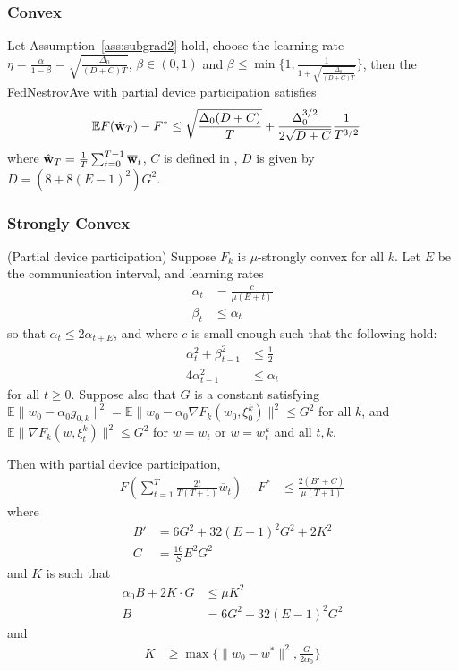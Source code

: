 \subsubsection{Convex}
\begin{theorem}
	Let Assumption~\ref{ass:subgrad2} hold, choose the learning rate $\eta = \frac{\alpha}{1 - \beta} = \sqrt{\frac{\Delta_0}{(D+C)T}}$, $\beta \in (0, 1)$ and $\beta \leq \min\{1, \frac{1}{1 + \sqrt{\frac{\Delta_0}{(D+C)T}}}\}$, then the FedNestrovAve with partial device participation satisfies
	\begin{align}
		 \mathbb{E} F(\hat{{\mathbf{w}}}_T) - F^* &\leq \sqrt{\frac{\Delta_0(D + C)}{T}} + \frac{\Delta_0^{3/2}}{2\sqrt{D+C}}\frac{1}{T^{3/2}} 
	\end{align}
	where $\hat{{\mathbf{w}}}_T = \frac{1}{T}\sum_{t=0}^{T-1} {\overline{\mathbf{w}}}_t$, $C$ is defined in \eq{\ref{eq:partialsample}},
$D$ is given by $D = (8 + 8(E-1)^2)G^2$.
	\label{th:nasgcvxnonsmoth}
\end{theorem}

\subsubsection{Strongly Convex}
% 
\begin{theorem}
	(Partial device participation) Suppose $F_{k}$ is $\mu$-strongly
	convex for all $k$. Let $E$ be the communication interval, and learning
	rates 
	\begin{align*}
	\alpha_{t} & =\frac{c}{\mu(E+t)}\\
	\beta_{t} & \leq\alpha_{t}
	\end{align*}
	so that $\alpha_{t}\leq2\alpha_{t+E}$, and where $c$ is small enough
	such that the following hold: 
	\begin{align*}
	\alpha_{t}^{2}+\beta_{t-1}^{2} & \leq\frac{1}{2}\\
	4\alpha_{t-1}^{2} & \leq\alpha_{t}
	\end{align*}
	for all $t\geq0$. Suppose also that $G$ is a constant satisfying
	$\mathbb{E}\|w_{0}-\alpha_{0}g_{0,k}\|^{2}=\mathbb{E}\|w_{0}-\alpha_{0}\nabla F_{k}(w_{0},\xi_{0}^{k})\|^{2}\leq G^{2}$
	for all $k$, and $\mathbb{E}\|\nabla F_{k}(w,\xi_{t}^{k})\|^{2}\leq G^{2}$
	for $w=\overline{w}_{t}$ or $w=w_{t}^{k}$ and all $t,k$.
	
	Then with partial device participation, \textbf{
		\begin{align*}
		F(\sum_{t=1}^{T}\frac{2t}{T(T+1)}\overline{w}_{t})-F^{\ast} & \leq\frac{2(B'+C)}{\mu(T+1)}
		\end{align*}
	} where
	\begin{align*}
	B' & =6G^{2}+32(E-1)^{2}G^{2}+2K^{2}\\
	C & =\frac{16}{S}E^{2}G^{2}
	\end{align*}
	and $K$ is such that 
	\begin{align*}
	\alpha_{0}B+2K\cdot G & \leq\mu K^{2}\\
	B & =6G^{2}+32(E-1)^{2}G^{2}
	\end{align*}
	and
	\begin{align*}
	K & \geq\max\{\|w_{0}-w^{\ast}\|^{2},\frac{G}{2\alpha_{0}}\}
	\end{align*}
\end{theorem}
